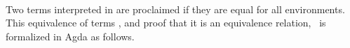 \begin{code}
%
\>[18]\AgdaSpace{}%
%
\>[27]\AgdaSymbol{=}\AgdaSpace{}%
\AgdaSymbol{(}\AgdaSpace{}%
\AgdaSymbol{)}\AgdaSpace{}%
\AgdaSpace{}%
\AgdaSymbol{(}\AgdaSpace{}%
\AgdaOperator{\AgdaInductiveConstructor{,}}\AgdaSpace{}%
\AgdaSpace{}%
\AgdaSpace{}%
\AgdaSpace{}%
\AgdaSpace{}%
\AgdaSpace{}%
\AgdaSpace{}%
\AgdaSpace{}%
\AgdaSpace{}%
\AgdaSymbol{)}\<%
\\
%
\>[1]\AgdaSpace{}%
\AgdaSpace{}%
\AgdaSpace{}%
\AgdaSpace{}%
\AgdaSpace{}%
%
\>[27]\AgdaSymbol{=}\AgdaSpace{}%
\AgdaSpace{}%
\<%
\\
%
\>[1]\AgdaSpace{}%
\AgdaSpace{}%
\AgdaSpace{}%
\AgdaSpace{}%
\AgdaSpace{}%
\AgdaSpace{}%
%
\>[27]\AgdaSymbol{=}\AgdaSpace{}%
\AgdaSpace{}%
\AgdaSymbol{(}\AgdaSpace{}%
\AgdaSymbol{)(}\AgdaSpace{}%
\AgdaOperator{\AgdaInductiveConstructor{,}}\AgdaSpace{}%
\AgdaSpace{}%
\AgdaSpace{}%
\AgdaSpace{}%
\AgdaSpace{}%
\AgdaSpace{}%
\AgdaSpace{}%
\AgdaSpace{}%
\AgdaSpace{}%
\AgdaSpace{}%
\AgdaSymbol{)}\<%
\\
\>[0]\<%
\end{code}

Two terms interpreted in  are proclaimed  if they are equal for all environments.  This equivalence of terms%
\ifshort\else
, and proof that it is an equivalence relation,
\fi
~is formalized in Agda as follows.


